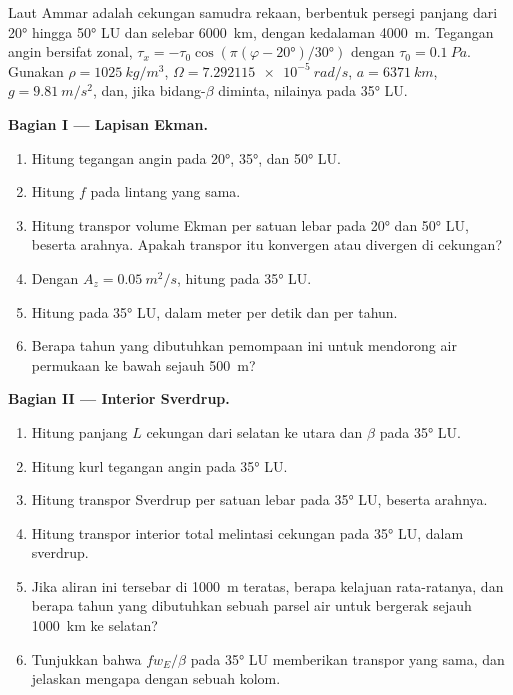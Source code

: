 \begin{problem}
\label{pb:b3:ocean-dynamics:1}
Laut Ammar adalah cekungan samudra rekaan, berbentuk persegi panjang dari \ang{20} hingga
\ang{50} LU dan selebar \qty{6000}{km}, dengan kedalaman \qty{4000}{m}. Tegangan angin bersifat
zonal, $\tau_x = -\tau_0\cos(\pi(\varphi - \ang{20})/\ang{30})$ dengan $\tau_0
= \qty{0.1}{Pa}$. Gunakan $\rho = \qty{1025}{kg/m^3}$, $\Omega =
\qty{7.292115e-5}{rad/s}$, $a = \qty{6371}{km}$, $g = \qty{9.81}{m/s^2}$,
dan, jika bidang-$\beta$ diminta, nilainya pada \ang{35} LU.

\medskip\noindent\textbf{Bagian I --- Lapisan Ekman.}
\begin{enumerate}
\item Hitung tegangan angin pada \ang{20}, \ang{35}, dan \ang{50} LU.
\item Hitung $f$ pada lintang yang sama.
\item Hitung transpor volume Ekman per satuan lebar pada \ang{20} dan
  \ang{50} LU, beserta arahnya. Apakah transpor itu konvergen atau divergen di
  cekungan?
\item Dengan $A_z = \qty{0.05}{m^2/s}$, hitung  pada \ang{35} LU.
\item Hitung  pada \ang{35} LU, dalam meter per detik dan per
  tahun.
\item Berapa tahun yang dibutuhkan pemompaan ini untuk mendorong air permukaan
  ke bawah sejauh \qty{500}{m}?
\end{enumerate}

\medskip\noindent\textbf{Bagian II --- Interior Sverdrup.}
\begin{enumerate}[resume]
\item Hitung panjang $L$ cekungan dari selatan ke utara dan $\beta$ pada
  \ang{35} LU.
\item Hitung kurl tegangan angin pada \ang{35} LU.
\item Hitung transpor Sverdrup per satuan lebar pada \ang{35} LU, beserta
  arahnya.
\item Hitung transpor interior total melintasi cekungan pada \ang{35} LU,
  dalam sverdrup.
\item Jika aliran ini tersebar di \qty{1000}{m} teratas, berapa kelajuan rata-ratanya,
  dan berapa tahun yang dibutuhkan sebuah parsel air untuk bergerak sejauh \qty{1000}{km}
  ke selatan?
\item Tunjukkan bahwa $fw_E/\beta$ pada \ang{35} LU memberikan transpor yang sama, dan
  jelaskan mengapa dengan  sebuah kolom.
\end{enumerate}


\end{problem}

